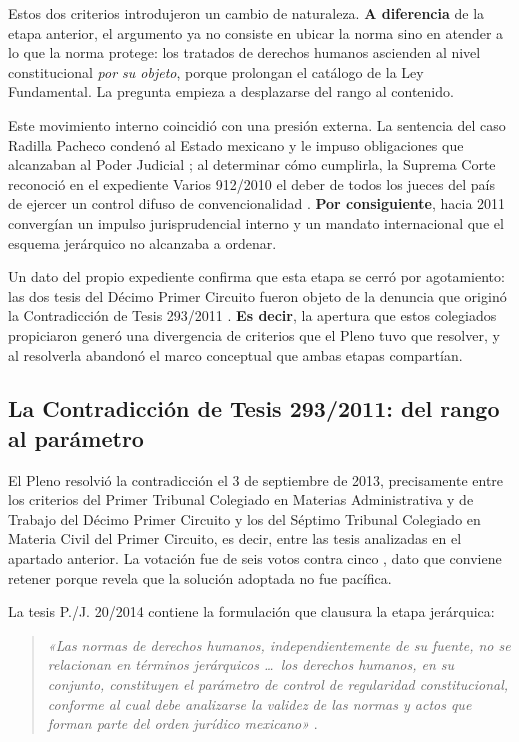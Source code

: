 \documentclass[
  spanish,
  letterpaper, oneside
]{article}
\begin{document}
Estos dos criterios introdujeron un cambio de naturaleza. \textbf{A diferencia} de la etapa anterior, el argumento ya no consiste en ubicar la norma sino en atender a lo que la norma protege: los tratados de derechos humanos ascienden al nivel constitucional \emph{por su objeto}, porque prolongan el catálogo de la Ley Fundamental. La pregunta empieza a desplazarse del rango al contenido.

Este movimiento interno coincidió con una presión externa. La sentencia del caso Radilla Pacheco condenó al Estado mexicano y le impuso obligaciones que alcanzaban al Poder Judicial \citep{cidhCasoRadillaPacheco2009}; al determinar cómo cumplirla, la Suprema Corte reconoció en el expediente Varios 912/2010 el deber de todos los jueces del país de ejercer un control difuso de convencionalidad \citep{scjnVarios912de2010}. \textbf{Por consiguiente}, hacia 2011 convergían un impulso jurisprudencial interno y un mandato internacional que el esquema jerárquico no alcanzaba a ordenar.

Un dato del propio expediente confirma que esta etapa se cerró por agotamiento: las dos tesis del Décimo Primer Circuito fueron objeto de la denuncia que originó la Contradicción de Tesis 293/2011 \citep{scjnTesis164611}. \textbf{Es decir}, la apertura que estos colegiados propiciaron generó una divergencia de criterios que el Pleno tuvo que resolver, y al resolverla abandonó el marco conceptual que ambas etapas compartían.

\subsection{La Contradicción de Tesis 293/2011: del rango al parámetro}

El Pleno resolvió la contradicción el 3 de septiembre de 2013, precisamente entre los criterios del Primer Tribunal Colegiado en Materias Administrativa y de Trabajo del Décimo Primer Circuito y los del Séptimo Tribunal Colegiado en Materia Civil del Primer Circuito, es decir, entre las tesis analizadas en el apartado anterior. La votación fue de seis votos contra cinco \citep{scjnTesis2006225}, dato que conviene retener porque revela que la solución adoptada no fue pacífica.

La tesis P./J. 20/2014 contiene la formulación que clausura la etapa jerárquica:

\begin{quote}
\textit{«Las normas de derechos humanos, independientemente de su fuente, no se relacionan en términos jerárquicos \dots\ los derechos humanos, en su conjunto, constituyen el parámetro de control de regularidad constitucional, conforme al cual debe analizarse la validez de las normas y actos que forman parte del orden jurídico mexicano»} \citep[tesis P./J. 20/2014]{scjnTesis2006224}.
\end{quote}
\end{document}
